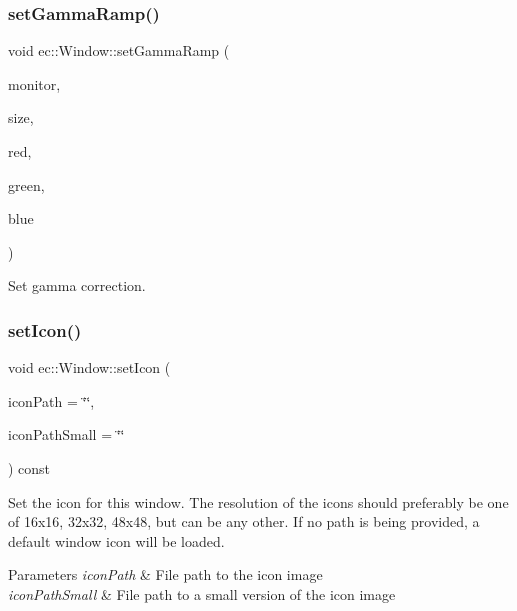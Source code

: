 \subsubsection{\texorpdfstring{set\+Gamma\+Ramp()}{setGammaRamp()}\hspace{0.1cm}{\footnotesize\ttfamily [2/2]}}
{\footnotesize\ttfamily void ec\+::\+Window\+::set\+Gamma\+Ramp (\begin{DoxyParamCaption}\item[{G\+L\+F\+Wmonitor $\ast$}]{monitor,  }\item[{int}]{size,  }\item[{unsigned short $\ast$}]{red,  }\item[{unsigned short $\ast$}]{green,  }\item[{unsigned short $\ast$}]{blue }\end{DoxyParamCaption})\hspace{0.3cm}{\ttfamily [static]}}

Set gamma correction. \mbox{\label{classec_1_1_window_a906d0c0d6b6c50bb98de694b5a09dc17}} 
\subsubsection{\texorpdfstring{set\+Icon()}{setIcon()}}
{\footnotesize\ttfamily void ec\+::\+Window\+::set\+Icon (\begin{DoxyParamCaption}\item[{const char $\ast$}]{icon\+Path = {\ttfamily \char`\"{}\char`\"{}},  }\item[{const char $\ast$}]{icon\+Path\+Small = {\ttfamily \char`\"{}\char`\"{}} }\end{DoxyParamCaption}) const}



Set the icon for this window. The resolution of the icons should preferably be one of 16x16, 32x32, 48x48, but can be any other. If no path is being provided, a default window icon will be loaded. 


\begin{DoxyParams}{Parameters}
{\em icon\+Path} & File path to the icon image \\
\hline
{\em icon\+Path\+Small} & File path to a small version of the icon image \\
\hline
\end{DoxyParams}
\mbox{\label{classec_1_1_window_a093cfa214eafa8cfd1045d23b4e05d60}} 
